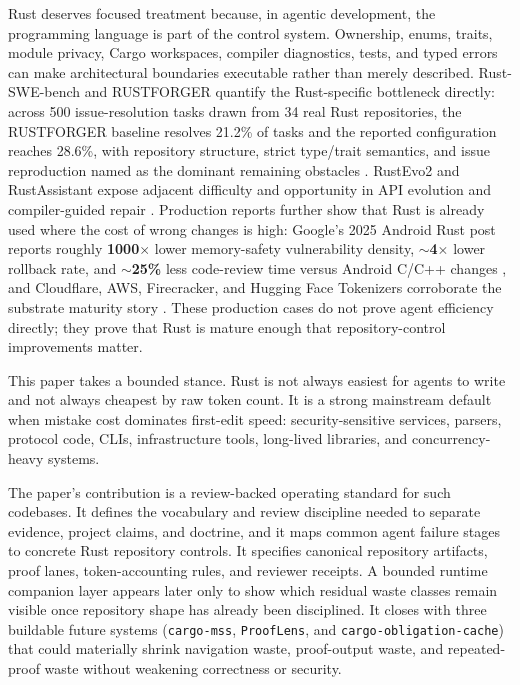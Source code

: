 \documentclass[conference]{IEEEtran}
\begin{document}
Rust deserves focused treatment because, in agentic development, the programming language is part of the control system. Ownership, enums, traits, module privacy, Cargo workspaces, compiler diagnostics, tests, and typed errors can make architectural boundaries executable rather than merely described. Rust-SWE-bench and RUSTFORGER quantify the Rust-specific bottleneck directly: across 500 issue-resolution tasks drawn from 34 real Rust repositories, the RUSTFORGER baseline resolves 21.2\% of tasks and the reported configuration reaches 28.6\%, with repository structure, strict type/trait semantics, and issue reproduction named as the dominant remaining obstacles \cite{rustSweBench2026}. RustEvo2 and RustAssistant expose adjacent difficulty and opportunity in API evolution and compiler-guided repair \cite{rustEvo2025,rustAssistant2025}. Production reports further show that Rust is already used where the cost of wrong changes is high: Google's 2025 Android Rust post reports roughly \textbf{1000$\times$} lower memory-safety vulnerability density, \textbf{$\sim$4$\times$} lower rollback rate, and \textbf{$\sim$25\%} less code-review time versus Android C/C++ changes \cite{googleAndroid2025}, and Cloudflare, AWS, Firecracker, and Hugging Face Tokenizers corroborate the substrate maturity story \cite{cloudflareRust2025,awsRust2022,firecracker2026,hfTokenizers2026}. These production cases do not prove agent efficiency directly; they prove that Rust is mature enough that repository-control improvements matter.

This paper takes a bounded stance. Rust is not always easiest for agents to write and not always cheapest by raw token count. It is a strong mainstream default when mistake cost dominates first-edit speed: security-sensitive services, parsers, protocol code, CLIs, infrastructure tools, long-lived libraries, and concurrency-heavy systems.

The paper's contribution is a review-backed operating standard for such codebases. It defines the vocabulary and review discipline needed to separate evidence, project claims, and doctrine, and it maps common agent failure stages to concrete Rust repository controls. It specifies canonical repository artifacts, proof lanes, token-accounting rules, and reviewer receipts. A bounded runtime companion layer appears later only to show which residual waste classes remain visible once repository shape has already been disciplined. It closes with three buildable future systems (\texttt{cargo-mss}, \texttt{ProofLens}, and \texttt{cargo-obligation-cache}) that could materially shrink navigation waste, proof-output waste, and repeated-proof waste without weakening correctness or security.
\end{document}
